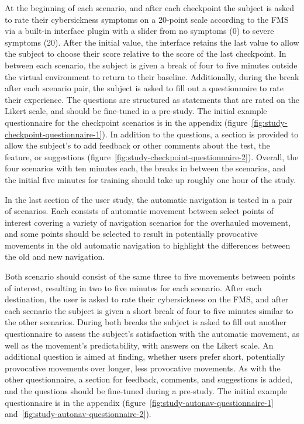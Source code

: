 At the beginning of each scenario, and after each checkpoint the subject is asked to rate their cybersickness symptoms
on a 20-point scale according to the FMS via a built-in interface plugin with a slider from no symptoms (0) to severe
symptoms (20).
After the initial value, the interface retains the last value to allow the subject to choose their score relative to
the score of the last checkpoint.
In between each scenario, the subject is given a break of four to five minutes outside the virtual environment to
return to their baseline.
Additionally, during the break after each scenario pair, the subject is asked to fill out a questionnaire to rate
their experience.
The questions are structured as statements that are rated on the Likert scale, and should be fine-tuned in a pre-study.
The initial example questionnaire for the checkpoint scenarios is in the appendix
(figure~\ref{fig:study-checkpoint-questionnaire-1}).
In addition to the questions, a section is provided to allow the subject's to add feedback or other comments
about the test, the feature, or suggestions (figure~\ref{fig:study-checkpoint-questionnaire-2}).
Overall, the four scenarios with ten minutes each, the breaks in between the scenarios, and the initial five minutes for
training should take up roughly one hour of the study.

In the last section of the user study, the automatic navigation is tested in a pair of scenarios.
Each consists of automatic movement between select points of interest covering a variety of navigation scenarios for
the overhauled movement, and some points should be selected to result in potentially provocative movements in the old
automatic navigation to highlight the differences between the old and new navigation.

Both scenario should consist of the same three to five movements between points of interest, resulting in two to five
minutes for each scenario.
After each destination, the user is asked to rate their cybersickness on the FMS, and after each scenario the subject is
given a short break of four to five minutes similar to the other scenarios.
During both breaks the subject is asked to fill out another questionnaire to assess the subject's satisfaction with
the automatic movement, as well as the movement's predictability, with answers on the Likert scale.
An additional question is aimed at finding, whether users prefer short, potentially provocative movements over longer,
less provocative movements.
As with the other questionnaire, a section for feedback, comments, and suggestions is added, and the questions
should be fine-tuned during a pre-study.
The initial example questionnaire is in the appendix (figure~\ref{fig:study-autonav-questionnaire-1}
and~\ref{fig:study-autonav-questionnaire-2}).


